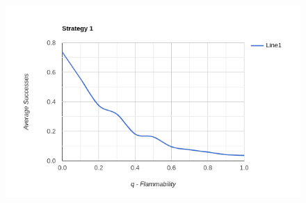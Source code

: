 \documentclass[11pt]{scrartcl} %
\begin{document}
\begin{figure}[H]
 	
  	\includegraphics*[scale=0.8]{strategy1.png}
	\label{fig:example}
 \end{figure}
\end{document}
